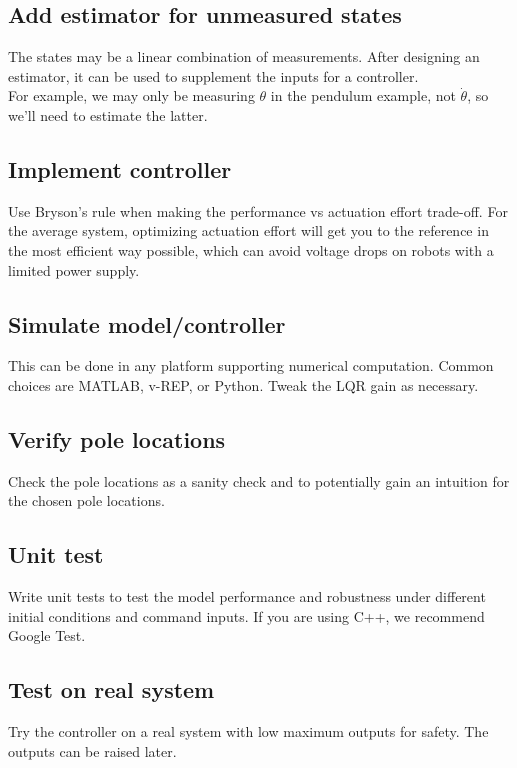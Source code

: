\subsection{Add estimator for unmeasured states}

The states may be a linear combination of measurements. After designing an
estimator, it can be used to supplement the inputs for a controller. \\

For example, we may only be measuring $\theta$ in the pendulum example, not
$\dot{\theta}$, so we'll need to estimate the latter.

\subsection{Implement controller}

Use Bryson's rule when making the performance vs actuation effort trade-off. For
the average system, optimizing actuation effort will get you to the reference in
the most efficient way possible, which can avoid voltage drops on robots with a
limited power supply.

\subsection{Simulate model/controller}

This can be done in any platform supporting numerical computation. Common
choices are MATLAB, v-REP, or Python. Tweak the LQR gain as necessary.

\subsection{Verify pole locations}

Check the pole locations as a sanity check and to potentially gain an intuition
for the chosen pole locations.

\subsection{Unit test}

Write unit tests to test the \gls{model} performance and \gls{robustness} under
different initial conditions and command inputs. If you are using C++, we
recommend Google Test.

\subsection{Test on real system}

Try the controller on a real \gls{system} with low maximum outputs for safety.
The outputs can be raised later.
